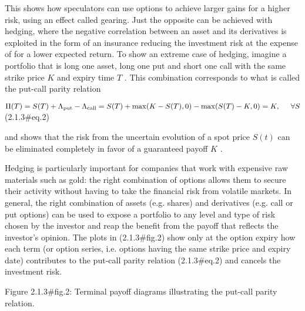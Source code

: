 \documentclass{beamer}
\begin{document}
\begin{frame}
This shows how speculators can use options to achieve larger gains for a higher risk, using an effect called gearing. Just the opposite can be achieved with hedging, where the negative correlation between an asset and its derivatives is exploited in the form of an insurance reducing the investment risk at the expense of for a lower expected return. To show an extreme case of hedging, imagine a portfolio that is long one asset, long one put and short one call with the same strike price $ K$ and expiry time $ T$ . This combination corresponds to what is called the put-call parity relation

 $\displaystyle \Pi(T) = S(T)+\Lambda_\mathrm{put}-\Lambda_\mathrm{call} = S(T) + \mathrm{max}(K-S(T),0) -\mathrm{max}(S(T)-K,0) = K, \hspace{5mm}\forall S$	 (2.1.3#eq.2)

and shows that the risk from the uncertain evolution of a spot price  $ S(t)$ can be eliminated completely in favor of a guaranteed payoff $ K$ . 

\end{frame}
\begin{frame}

Hedging is particularly important for companies that work with expensive raw materials such as gold: the right combination of options allows them to secure their activity without having to take the financial risk from volatile markets.
In general, the right combination of assets (e.g. shares) and derivatives (e.g. call or put options) can be used to expose a portfolio to any level and type of risk chosen by the investor and reap the benefit from the payoff that reflects the investor's opinion. The plots in (2.1.3#fig.2) show only at the option expiry how each term (or option series, i.e. options having the same strike price and expiry date) contributes to the put-call parity relation (2.1.3#eq.2) and cancels the investment risk.

Figure 2.1.3#fig.2: Terminal payoff diagrams illustrating the put-call parity relation.
\end{frame}
\end{document}
